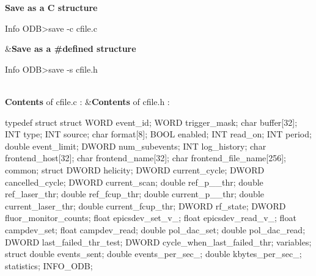 \begin{TabularC}{2}
\hline
{\bfseries Save as a C structure} 
\begin{DoxyCode}
Info ODB>save  -c cfile.c
\end{DoxyCode}
  &{\bfseries Save as a \#defined structure } 
\begin{DoxyCode}
Info ODB>save  -s cfile.h
\end{DoxyCode}
  

\\
{\bfseries Contents} of cfile.c : &{\bfseries Contents} of cfile.h :   \\

\begin{DoxyCode}
typedef struct {
  struct {
    WORD      event_id;
    WORD      trigger_mask;
    char      buffer[32];
    INT       type;
    INT       source;
    char      format[8];
    BOOL      enabled;
    INT       read_on;
    INT       period;
    double    event_limit;
    DWORD     num_subevents;
    INT       log_history;
    char      frontend_host[32];
    char      frontend_name[32];
    char      frontend_file_name[256];
  } common;
  struct {
    DWORD     helicity;
    DWORD     current_cycle;
    DWORD     cancelled_cycle;
    DWORD     current_scan;
    double    ref_p__thr;
    double    ref_laser_thr;
    double    ref_fcup_thr;
    double    current_p__thr;
 double    current_laser_thr;
    double    current_fcup_thr;
    DWORD     rf_state;
    DWORD     fluor_monitor_counts;
    float     epicsdev_set_v_;
    float     epicsdev_read_v_;
    float     campdev_set;
    float     campdev_read;
    double    pol_dac_set;
    double    pol_dac_read;
    DWORD     last_failed_thr_test;
    DWORD     cycle_when_last_failed_thr;
  } variables;
  struct {
    double    events_sent;
    double    events_per_sec_;
    double    kbytes_per_sec_;
  } statistics;
} INFO_ODB;
\end{DoxyCode}
 


\end{TabularC}
